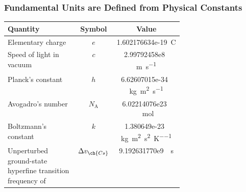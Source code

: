 \documentclass[notes=show]{beamer}
\begin{document}
\begin{frame}[c]
	\frametitle{Fundamental Units are Defined from Physical Constants}

	\begin{center}
		\renewcommand\arraystretch{1.1}
		\begin{tabular}
			{>{\raggedright\arraybackslash}m{0.4\linewidth}cS}
			\toprule
			\bfseries Quantity & \bfseries Symbol & \bfseries Value \\ \midrule
			Elementary charge & $e$ & 1.602176634e-19 \,\si{\coulomb} \\
			Speed of light in vacuum & $c$ & 2.99792458e8 \,\si{\meter\per\second} \\
			Planck's constant & $h$ & 6.62607015e-34 \,\si{\kilo\gram\meter\squared\per\second} \\
			Avogadro's number & $N_{\textrm{A}}$ & 6.02214076e23 \,\si{\per\mole} \\
			Boltzmann's constant & $k$ & 1.380649e-23 \,\si{\kilo\gram\meter\squared\per\second\squared\per\kelvin} \\
			Unperturbed ground-state hyperfine transition frequency of  & $\Delta v_{\ch{Cs}}$
												 & 9.192631770e9
												 \,\si{\per\second}
			\\
			\bottomrule
		\end{tabular}
	\end{center}
\end{frame}
\end{document}
